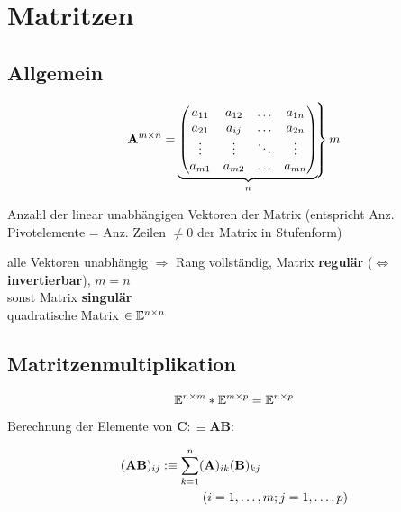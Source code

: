 \section{Matritzen}
	
	\subsection{Allgemein}
	
		\[
			\mA^{m \times n} = 					
			\underbrace{
				\begin{pmatrix}
					a_{11} 	& a_{12} & \ldots & a_{1n} \\
					a_{21} 	& a_{ij} & \ldots & a_{2n} \\
					\vdots 	& \vdots & \ddots & \vdots \\
					a_{m1}	&a _{m2} & \ldots & a_{mn} 
				\end{pmatrix} 
			}_{n} 
			\left. 
			\begin{array}{c} \\ \\ \\ \\ \\ \end{array} 
			\hspace{-5mm} \right\rbrace  m
		\]
		
		\begin{fdef}[Rang]
			Anzahl der linear unabhängigen Vektoren der Matrix (entspricht Anz. 
			Pivotelemente = Anz. Zeilen $\ne 0$ der Matrix in Stufenform)
		\end{fdef}
		
		alle Vektoren unabhängig $\Rightarrow$ Rang vollständig, Matrix 
		\textbf{regulär} ($\Leftrightarrow$ \textbf{invertierbar}), $m = n$\\
		sonst Matrix \textbf{singulär} \\[-2mm]
		
		quadratische Matrix $\in \mathbb{E}^{n \times n}$

		
	\subsection{Matritzenmultiplikation}
	
    	\[
    		\mathbb{E}^{n \times m} * \mathbb{E}^{m \times p} 
    		= \mathbb{E}^{n \times p}
    	\]
    	
    	Berechnung der Elemente von $\mathbf{C} :\equiv \mathbf{AB}$:
    	
    	\begin{align*}
    		(\mathbf{AB})_{ij} & :\equiv 
    		\sum_{k=1}^{n} (\mathbf{A})_{ik} (\mathbf{B})_{kj} \\
    		&\mathrel{\phantom{=}} \qquad (i = 1, \dots ,m; j = 1, \dots ,p)
    	\end{align*}
    	
